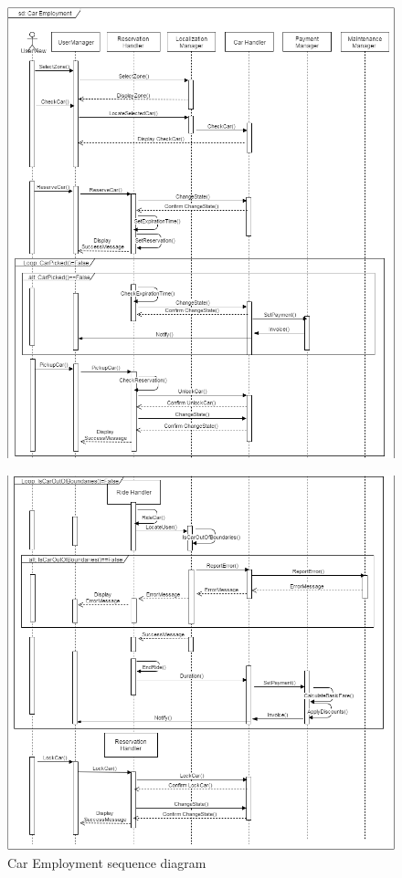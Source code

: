 		\begin{figure}[h]
			\includegraphics[scale=0.55]{img/CarEmploymentSD1.png}
			
		\end{figure}
		\newpage
		\begin{figure}[h]
			\includegraphics[scale=0.55]{img/CarEmploymentSD2.png}
			\caption{Car Employment sequence diagram}
		\end{figure}
		
